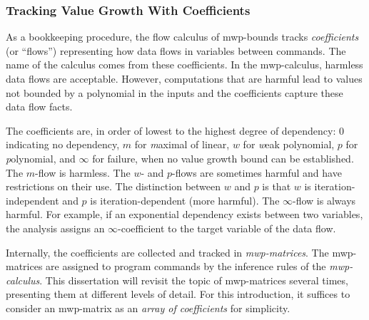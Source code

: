 \subsubsection{Tracking Value Growth With Coefficients}

As a bookkeeping procedure, the flow calculus of mwp-bounds tracks
\emph{coefficients} (or \enquote{flows})
representing how data flows in variables between commands.
The name of the calculus comes from these coefficients.
In the mwp-calculus, harmless data flows are acceptable.
However, computations that are harmful lead to values not bounded by a polynomial in the inputs and the coefficients capture these data flow facts.

The coefficients are, in order of lowest to the highest degree of dependency:
\({0}\) indicating no dependency,
\({m}\) for \emph{m}aximal of linear,
\({w}\) for \emph{w}eak polynomial,
\({p}\) for \emph{p}olynomial, and
\({\infty}\) for failure, when no value growth bound can be established.
\noindent The \(m\)-flow is harmless.
The \(w\)- and \(p\)-flows are sometimes harmful and have restrictions on their use.
The distinction between \(w\) and \(p\) is that \(w\) is
iteration-independent and \(p\) is
iteration-dependent (more harmful).
The \(\infty\)-flow is always harmful.
For example, if an exponential dependency exists between two variables,
the analysis assigns an \(\infty\)-coefficient to the target variable of the data flow.

Internally, the coefficients are collected and tracked in \emph{mwp-matrices}.
The mwp-matrices are assigned to program commands by the inference rules of the \emph{mwp-calculus}.
This dissertation will revisit the topic of mwp-matrices several times, presenting them at different levels of detail.
For this introduction, it suffices to consider an mwp-matrix as an \emph{array of coefficients} for simplicity.

